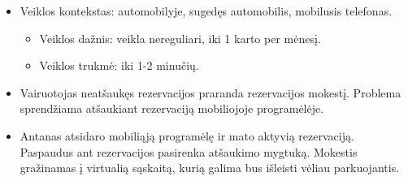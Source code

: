 \documentclass{VUMIFPSkursinis}
\begin{document}
\begin{enumerate}[label = \textbf{PV\arabic*.}]
\begin{itemize}[label={-}]
			\item Veiklos kontekstas: automobilyje, sugedęs automobilis, mobilusis telefonas.
				\begin{itemize}[label={$\bullet$}]
					\item Veiklos dažnis: veikla nereguliari, iki 1 karto per mėnesį.
					\item Veiklos trukmė: iki 1-2 minučių.
				\end{itemize}
			\item Vairuotojas neatšaukęs rezervacijos praranda rezervacijos mokestį. Problema sprendžiama atšaukiant rezervaciją mobiliojoje programėlėje.

			\item Antanas atsidaro mobiliąją programėlę ir mato aktyvią rezervaciją. Paspaudus ant rezervacijos pasirenka atšaukimo mygtuką. Mokestis gražinamas į virtualią sąskaitą, kurią galima bus išleisti vėliau parkuojantis.
			
		\end{itemize}
\end{enumerate}
\end{document}
